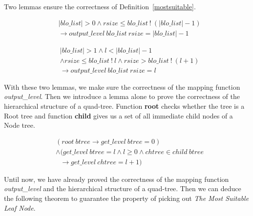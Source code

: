 Two lemmas ensure the correctness of Definition~\ref{mostsuitable}.

\begin{lemma} 
\end{lemma}
\vspace{-7pt}
{\footnotesize
\begin{align*}
&\vert blo\_list \vert > 0 \wedge rsize \leq blo\_list\ !\ (\vert blo\_list \vert - 1) \\
&\longrightarrow output\_level\ blo\_list\ rsize = \vert blo\_list \vert - 1
\end{align*}
}
\vspace{-12pt}	

\begin{lemma} 
\end{lemma}
\vspace{-7pt}
{\footnotesize
\begin{align*}
&\vert blo\_list \vert > 1 \wedge l < \vert blo\_list \vert - 1 \\
&\wedge rsize \leq blo\_list\ !\ l \wedge rsize > blo\_list\ !\ (l + 1) \\
&\longrightarrow output\_level\ blo\_list\ rsize = l
\end{align*}
}
\vspace{-12pt}

With these two lemmas, we make sure the correctness of the mapping function \emph{output\_level}. Then we introduce a lemma alone to prove the correctness of the hierarchical structure of a quad-tree. Function \textbf{root} checks whether the tree is a Root tree and function \textbf{child} gives us a set of all immediate child nodes of a Node tree.

\begin{lemma} 
\end{lemma}
\vspace{-7pt}
{\footnotesize
\begin{align*}
&(root\ btree \longrightarrow get\_level\ btree = 0) \\
&\wedge (get\_level\ btree = l \wedge l \geq 0 \wedge chtree \in child\ btree \\
&\ \ \ \longrightarrow get\_level\ chtree = l + 1)
\end{align*}
}	
\vspace{-12pt}

Until now, we have already proved the correctness of the mapping function \emph{output\_level} and the hierarchical structure of a quad-tree. Then we can deduce the following theorem to guarantee the property of picking out \emph{The Most Suitable Leaf Node}.

